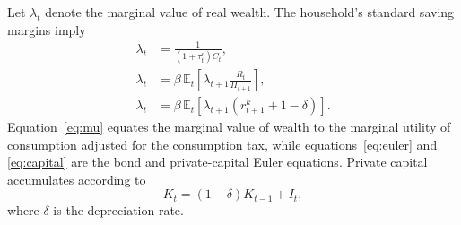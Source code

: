 \documentclass[a4paper,11pt]{article}
\begin{document}
Let $\lambda_t$ denote the marginal value of real wealth.
The household's standard saving margins imply
\begin{align}
    \lambda_t &= \frac{1}{\left(1+\tau_t^{c}\right) C_t}, \label{eq:mu}\\
    \lambda_t &= \beta\, \mathbb{E}_t\!\left[\lambda_{t+1}\frac{R_t}{\Pi_{t+1}}\right], \label{eq:euler}\\
    \lambda_t &= \beta\, \mathbb{E}_t\!\left[\lambda_{t+1}\left(r_{t+1}^{k} + 1 - \delta\right)\right]. \label{eq:capital}
\end{align}
Equation~\eqref{eq:mu} equates the marginal value of wealth to the marginal utility of consumption adjusted for the consumption tax, while equations~\eqref{eq:euler} and \eqref{eq:capital} are the bond and private-capital Euler equations.
Private capital accumulates according to
\begin{equation} \label{eq:privcapitalacc}
    K_t = (1-\delta) K_{t-1} + I_t,
\end{equation}
where $\delta$ is the depreciation rate.
\end{document}
